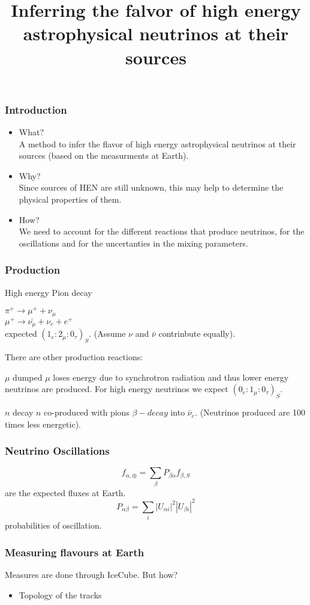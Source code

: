 \documentclass{beamer}
\title{Inferring the falvor of high energy astrophysical neutrinos at their sources}
\begin{document}
\begin{frame}
    \frametitle{Introduction}
    \begin{itemize}
    	\item What?
    	\\
    	A method to infer the flavor of high energy astrophysical neutrinos at their sources (based on the measurments at Earth).
    	\item Why?\\
    	Since sources of HEN are still unknown, this may help to determine the physical properties of them.
    	\item How?\\
    	We need to account for the different reactions that produce neutrinos, for the oscillations and for the uncertanties in the mixing parameters.
    \end{itemize}
\end{frame}
\frametitle{Production}
\begin{alertblock}{High energy Pion decay}
	\begin{center}
		$\pi^+\rightarrow \mu^++\nu_\mu$	\\
		$\mu^+\rightarrow\bar{\nu_\mu}+\nu_e+e^+$\\
		expected $(1_e:2_\mu:0_\tau)_S$. (Assume $\nu$ and $\bar\nu$ contrinbute equally).
	\end{center}
\end{alertblock}
There are other production reactions:
\begin{block}{$\mu$ dumped}
	$\mu$ loses energy due to synchrotron radiation and thus lower energy neutrinos are produced. For high energy neutrinos we expect $(0_e:1_\mu:0_\tau)_S$.
\end{block}
\begin{block}{$n$ decay}
	$n$ co-produced with pions $\beta-decay$ into $\bar\nu_e$. (Neutrinos produced are 100 times less energetic).
\end{block}
\begin{frame}
	\frametitle{Neutrino Oscillations}
	$$f_{\alpha,\oplus}=\sum_\beta P_{\beta\alpha}f_{\beta,S}$$ are the expected fluxes at Earth.
	$$P_{\alpha\beta}=\sum_{i}|U_{\alpha i}|^2|U_{\beta i}|^2$$ probabilities of oscillation.
\end{frame}
\begin{frame}
	\frametitle{Measuring flavours at Earth}
	Measures are done through IceCube. But how?
	\begin{itemize}
		\item Topology of the tracks
		
	\end{itemize}
\end{frame}
\end{document}
